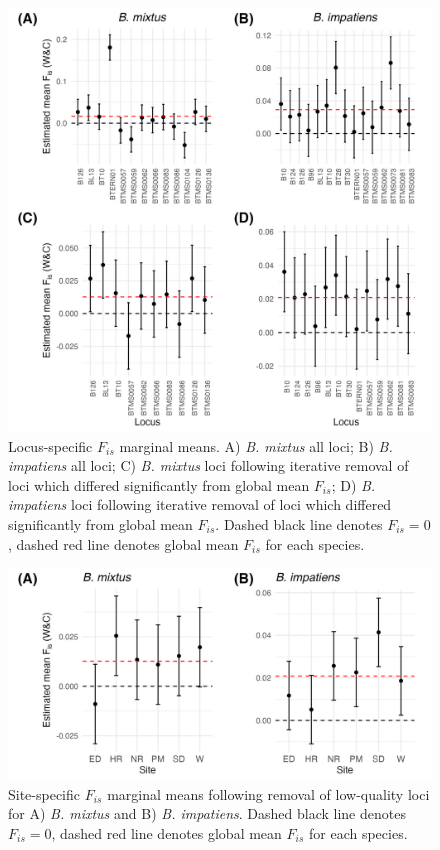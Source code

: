 \documentclass[12pt]{article}
\begin{document}
\begin{figure}[H]
    \centering
    \includegraphics[width=\linewidth]{appendix_figures/marginalmeans.jpg}
    \caption{Locus-specific $F_{is}$ marginal means. A) \emph{B. mixtus} all loci; B) \emph{B. impatiens} all loci; C) \emph{B. mixtus} loci following iterative removal of loci which differed significantly from global mean $F_{is}$; D) \emph{B. impatiens} loci following iterative removal of loci which differed significantly from global mean $F_{is}$. Dashed black line denotes $F_{is} = 0$, dashed red line denotes global mean $F_{is}$ for each species.}
    \label{fig:marginalmeans}
\end{figure}


\begin{figure}[H]
    \centering
    \includegraphics[width=\linewidth]{appendix_figures/siteFis.jpg}
    \caption{Site-specific $F_{is}$ marginal means following removal of low-quality loci for A) \emph{B. mixtus} and B) \emph{B. impatiens}. Dashed black line denotes $F_{is} = 0$, dashed red line denotes global mean $F_{is}$ for each species.}
    \label{fig:siteFis}
\end{figure}
\end{document}
